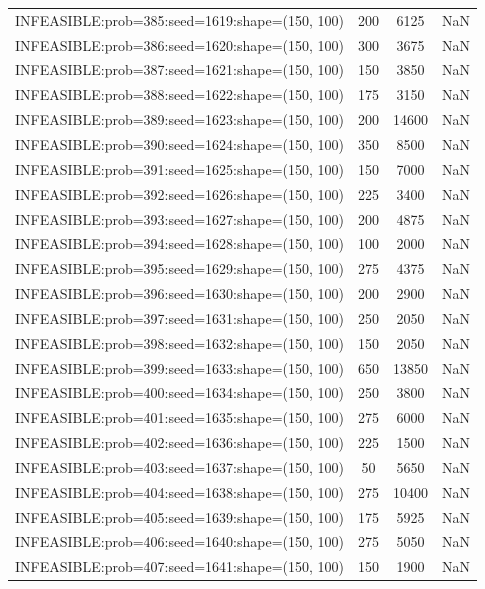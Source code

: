 \begin{longtable}{lccc}
INFEASIBLE:prob=385:seed=1619:shape=(150, 100) &      200 &  6125 &    NaN \\
INFEASIBLE:prob=386:seed=1620:shape=(150, 100) &      300 &  3675 &    NaN \\
INFEASIBLE:prob=387:seed=1621:shape=(150, 100) &      150 &  3850 &    NaN \\
INFEASIBLE:prob=388:seed=1622:shape=(150, 100) &      175 &  3150 &    NaN \\
INFEASIBLE:prob=389:seed=1623:shape=(150, 100) &      200 & 14600 &    NaN \\
INFEASIBLE:prob=390:seed=1624:shape=(150, 100) &      350 &  8500 &    NaN \\
INFEASIBLE:prob=391:seed=1625:shape=(150, 100) &      150 &  7000 &    NaN \\
INFEASIBLE:prob=392:seed=1626:shape=(150, 100) &      225 &  3400 &    NaN \\
INFEASIBLE:prob=393:seed=1627:shape=(150, 100) &      200 &  4875 &    NaN \\
INFEASIBLE:prob=394:seed=1628:shape=(150, 100) &      100 &  2000 &    NaN \\
INFEASIBLE:prob=395:seed=1629:shape=(150, 100) &      275 &  4375 &    NaN \\
INFEASIBLE:prob=396:seed=1630:shape=(150, 100) &      200 &  2900 &    NaN \\
INFEASIBLE:prob=397:seed=1631:shape=(150, 100) &      250 &  2050 &    NaN \\
INFEASIBLE:prob=398:seed=1632:shape=(150, 100) &      150 &  2050 &    NaN \\
INFEASIBLE:prob=399:seed=1633:shape=(150, 100) &      650 & 13850 &    NaN \\
INFEASIBLE:prob=400:seed=1634:shape=(150, 100) &      250 &  3800 &    NaN \\
INFEASIBLE:prob=401:seed=1635:shape=(150, 100) &      275 &  6000 &    NaN \\
INFEASIBLE:prob=402:seed=1636:shape=(150, 100) &      225 &  1500 &    NaN \\
INFEASIBLE:prob=403:seed=1637:shape=(150, 100) &       50 &  5650 &    NaN \\
INFEASIBLE:prob=404:seed=1638:shape=(150, 100) &      275 & 10400 &    NaN \\
INFEASIBLE:prob=405:seed=1639:shape=(150, 100) &      175 &  5925 &    NaN \\
INFEASIBLE:prob=406:seed=1640:shape=(150, 100) &      275 &  5050 &    NaN \\
INFEASIBLE:prob=407:seed=1641:shape=(150, 100) &      150 &  1900 &    NaN \\

\end{longtable}
